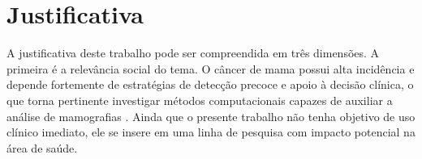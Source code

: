 \documentclass[
    12pt,
    openright,
    oneside,
    a4paper,
    english,
    brazil
]{abntex2}
\begin{document}
%
%
%
%

\section{Justificativa}

A justificativa deste trabalho pode ser compreendida em três dimensões. A primeira é a relevância social do tema. O câncer de mama possui alta incidência e depende fortemente de estratégias de detecção precoce e apoio à decisão clínica, o que torna pertinente investigar métodos computacionais capazes de auxiliar a análise de mamografias \cite{WHO2025BreastCancer}. Ainda que o presente trabalho não tenha objetivo de uso clínico imediato, ele se insere em uma linha de pesquisa com impacto potencial na área de saúde.
\end{document}
